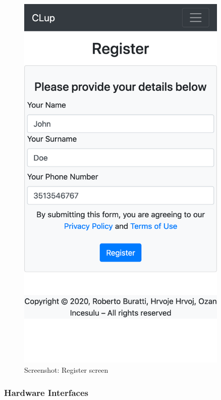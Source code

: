 \begin{figure}[H]
\begin{minipage}{0.45\textwidth}
        \includegraphics[width=0.9\textwidth]{Images/Screenshots/register.png} %
        \caption{Screenshot: Register screen}
    \end{minipage}
\end{figure}

\subsubsection{Hardware Interfaces}


